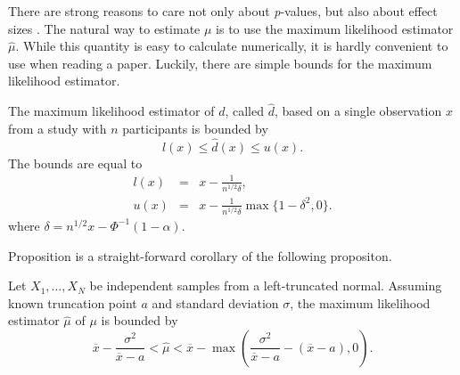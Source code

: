 There are strong reasons to care not only about \emph{p}-values, but
also about effect sizes \parencite{Funder2019-tg}. The natural way to
estimate $\mu$ is to use the maximum likelihood estimator $\hat{\mu}$.
While this quantity is easy to calculate numerically, it is hardly
convenient to use when reading a paper. Luckily, there are simple
bounds for the maximum likelihood estimator.
\begin{proposition}
\label{prop:maximum likelihood bounds}The maximum likelihood estimator
of $d$, called $\hat{d}$, based on a single observation $x$ from
a study with $n$ participants is bounded by 
\[
l(x)\leq\hat{d}(x)\leq u(x).
\]
The bounds are equal to
\begin{eqnarray}
l(x) & = & x-\frac{1}{n^{1/2}\delta},\label{eq:lower bound}\\
u(x) & = & x-\frac{1}{n^{1/2}\delta}\max\{1-\delta^{2},0\}.\label{eq:upper bound}
\end{eqnarray}
where $\delta=n^{1/2}x-\Phi^{-1}(1-\alpha)$.
\end{proposition}
Proposition \pageref{prop:maximum likelihood bounds} is a straight-forward
corollary of the following propositon. 
\begin{proposition}
\label{prop:ml bouds}Let $X_{1},\ldots,X_{N}$ be independent samples
from a left-truncated normal. Assuming known truncation point $a$
and standard deviation $\sigma$, the maximum likelihood estimator
$\hat{\mu}$ of $\mu$ is bounded by
\begin{equation}
\overline{x}-\frac{\sigma^{2}}{\overline{x}-a}<\hat{\mu}<\overline{x}-\max\left(\frac{\sigma^{2}}{\overline{x}-a}-(\overline{x}-a),0\right).\label{eq:ml bounds}
\end{equation}
\end{proposition}
